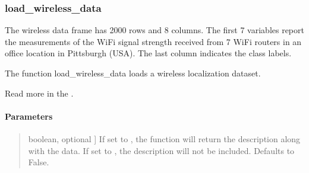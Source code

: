 \documentclass[letterpaper,10pt,english,openany,oneside]{sphinxmanual}
\begin{document}
\sphinxstepscope


\subsubsection{load\_wireless\_data}
\label{\detokenize{api_reference/generated/QuadratiK.datasets.load_wireless_data:load-wireless-data}}\label{\detokenize{api_reference/generated/QuadratiK.datasets.load_wireless_data::doc}}

\begin{fulllineitems}
\label{\detokenize{api_reference/generated/QuadratiK.datasets.load_wireless_data:QuadratiK.datasets.load_wireless_data}}
\pysigstartsignatures
{}
\pysigstopsignatures
\sphinxAtStartPar
The wireless data frame has 2000 rows and 8 columns. The first 7 variables
report the measurements of the Wi\sphinxhyphen{}Fi signal strength received from 7 Wi\sphinxhyphen{}Fi routers in an
office location in Pittsburgh (USA). The last column indicates the class labels.

\sphinxAtStartPar
The function load\_wireless\_data loads a wireless localization dataset.

\sphinxAtStartPar
Read more in the {\hyperref[\detokenize{user_guide/datasets:datasets}]{}}.


\paragraph{Parameters}
\label{\detokenize{api_reference/generated/QuadratiK.datasets.load_wireless_data:parameters}}\begin{quote}
\begin{description}
\sphinxlineitem{desc}{[}boolean, optional {]}
\sphinxAtStartPar
If set to , the function will return the description along with the data. 
If set to , the description will not be included. Defaults to False.


\end{description}
\end{quote}
\end{fulllineitems}
\end{document}
